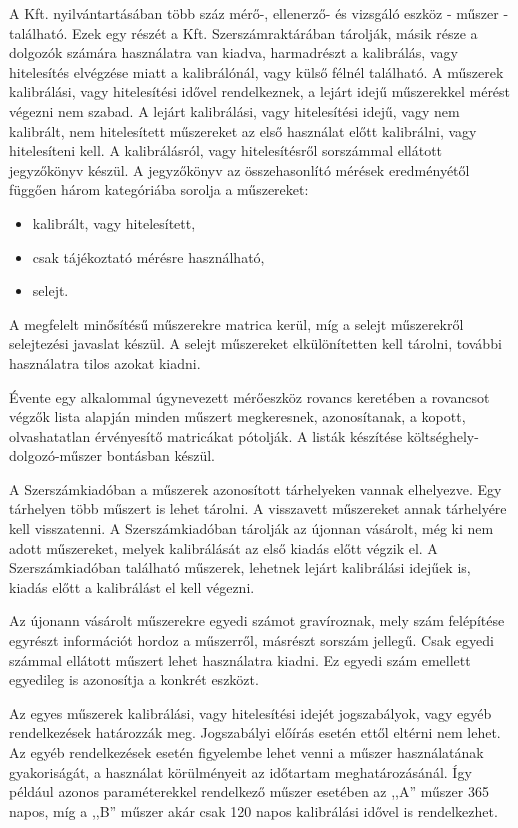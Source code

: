 \documentclass[a4paper,12pt]{report}
\begin{document}
A Kft. nyilvántartásában több száz mérő-, ellenerző- és vizsgáló eszköz 
- műszer - található. Ezek egy részét a Kft. Szerszámraktárában tárolják, másik 
része a dolgozók számára használatra van kiadva, harmadrészt a kalibrálás, vagy 
hitelesítés elvégzése miatt a kalibrálónál, vagy külső félnél található. 
A műszerek kalibrálási, vagy hitelesítési idővel rendelkeznek, a lejárt idejű 
műszerekkel mérést végezni nem szabad. A lejárt kalibrálási, vagy hitelesítési 
idejű, vagy nem kalibrált, nem hitelesített műszereket az első használat előtt 
kalibrálni, vagy hitelesíteni kell. A kalibrálásról, vagy hitelesítésről 
sorszámmal ellátott jegyzőkönyv készül. A jegyzőkönyv az összehasonlító mérések 
eredményétől függően három kategóriába sorolja a műszereket:
\begin{itemize}
 \item kalibrált, vagy hitelesített,
 \item csak tájékoztató mérésre használható,
 \item selejt.
\end{itemize}
A megfelelt minősítésű műszerekre matrica kerül, míg a selejt műszerekről 
selejtezési javaslat készül. A selejt műszereket elkülönítetten kell tárolni, 
további használatra tilos azokat kiadni.
 
Évente egy alkalommal úgynevezett mérőeszköz rovancs keretében a rovancsot 
végzők lista alapján minden műszert megkeresnek, azonosítanak, a kopott, 
olvashatatlan érvényesítő matricákat pótolják. A listák készítése 
költséghely-dolgozó-műszer bontásban készül.
 
A Szerszámkiadóban a műszerek azonosított tárhelyeken vannak elhelyezve. 
Egy tárhelyen több műszert is lehet tárolni. A visszavett műszereket annak 
tárhelyére kell visszatenni. A Szerszámkiadóban tárolják az újonnan vásárolt, 
még ki nem adott műszereket, melyek kalibrálását az első kiadás előtt végzik 
el. A Szerszámkiadóban található műszerek, lehetnek lejárt kalibrálási idejűek 
is, kiadás előtt a kalibrálást el kell végezni.

Az újonann vásárolt műszerekre egyedi számot gravíroznak, mely szám felépítése 
egyrészt információt hordoz a műszerről, másrészt sorszám jellegű. Csak egyedi 
számmal ellátott műszert lehet használatra kiadni. Ez egyedi szám emellett 
egyedileg is azonosítja a konkrét eszközt.

Az egyes műszerek kalibrálási, vagy hitelesítési idejét jogszabályok, vagy egyéb
rendelkezések határozzák meg. Jogszabályi előírás esetén ettől eltérni nem 
lehet. Az egyéb rendelkezések esetén figyelembe lehet venni a műszer 
használatának gyakoriságát, a használat körülményeit az időtartam 
meghatározásánál. 
Így például azonos paraméterekkel rendelkező műszer esetében az ,,A'' műszer
365 napos, míg a ,,B'' műszer akár csak 120 napos kalibrálási idővel is 
rendelkezhet.
\end{document}
